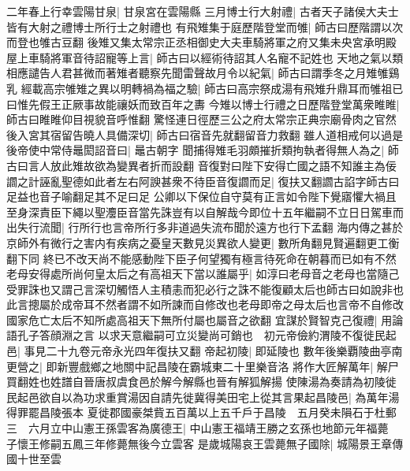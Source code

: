 二年春上行幸雲陽甘泉|{
	甘泉宮在雲陽縣}
三月博士行大射禮|{
	古者天子諸侯大夫士皆有大射之禮博士所行士之射禮也}
有飛雉集于庭歷階登堂而雊|{
	師古曰歷階謂以次而登也雊古豆翻}
後雉又集太常宗正丞相御史大夫車騎將軍之府又集未央宮承明殿屋上車騎將軍音待詔寵等上言|{
	師古曰以經術待詔其人名寵不記姓也}
天地之氣以類相應譴告人君甚微而著雉者聽察先聞雷聲故月令以紀氣|{
	師古曰謂季冬之月雉雊鷄乳}
經載高宗雊雉之異以明轉禍為福之驗|{
	師古曰高宗祭成湯有飛雉升鼎耳而雊祖已曰惟先假王正厥事故能禳妖而致百年之夀}
今雉以博士行禮之日歷階登堂萬衆睢睢|{
	師古曰睢睢仰目視貌音呼惟翻}
驚怪連日徑歷三公之府太常宗正典宗廟骨肉之官然後入宮其宿留告曉人具備深切|{
	師古曰宿音先就翻留音力救翻}
雖人道相戒何以過是後帝使中常侍鼂閎詔音曰|{
	鼂古朝字}
聞捕得雉毛羽頗摧折類拘執者得無人為之|{
	師古曰言人放此雉故欲為變異者折而設翻}
音復對曰陛下安得亡國之語不知誰主為佞讇之計誣亂聖德如此者左右阿諛甚衆不待臣音復讇而足|{
	復扶又翻讇古諂字師古曰足益也音子喻翻足其不足曰足}
公卿以下保位自守莫有正言如令陛下覺寤懼大禍且至身深責臣下繩以聖灋臣音當先誅豈有以自解哉今即位十五年繼嗣不立日日駕車而出失行流聞|{
	行所行也言帝所行多非道過失流布聞於遠方也行下孟翻}
海内傳之甚於京師外有微行之害内有疾病之憂皇天數見災異欲人變更|{
	數所角翻見賢遍翻更工衡翻下同}
終已不改天尚不能感動陛下臣子何望獨有極言待死命在朝暮而已如有不然老母安得處所尚何皇太后之有高祖天下當以誰屬乎|{
	如淳曰老母音之老母也當隨己受罪誅也又謂己言深切觸悟人主積恚而犯必行之誅不能復顧太后也師古曰如說非也此言摠屬於成帝耳不然者謂不如所諫而自修改也老母即帝之母太后也言帝不自修改國家危亡太后不知所處高祖天下無所付屬也屬音之欲翻}
宜謀於賢智克己復禮|{
	用論語孔子答顔淵之言}
以求天意繼嗣可立災變尚可銷也　初元帝儉約渭陵不復徙民起邑|{
	事見二十九卷元帝永光四年復扶又翻}
帝起初陵|{
	即延陵也}
數年後樂覇陵曲亭南更營之|{
	即新豐戲鄉之地關中記昌陵在霸城東二十里樂音洛}
將作大匠解萬年|{
	解尸買翻姓也姓譜自晉唐叔虞食邑於解今解縣也晉有解狐解揚}
使陳湯為奏請為初陵徙民起邑欲自以為功求重賞湯因自請先徙冀得美田宅上從其言果起昌陵邑|{
	為萬年湯得罪罷昌陵張本}
夏徙郡國豪桀貲五百萬以上五千戶于昌陵　五月癸未隕石于杜郵三　六月立中山憲王孫雲客為廣德王|{
	中山憲王福靖王勝之玄孫也地節元年福薨　子懷王修嗣五鳳三年修薨無後今立雲客}
是歲城陽哀王雲薨無子國除|{
	城陽景王章傳國十世至雲}


